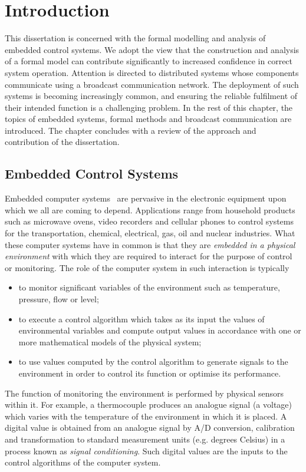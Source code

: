 \chapter{Introduction}\label{chap:intro}
This dissertation is concerned with the formal modelling and analysis
of embedded control systems. We adopt the view that the construction
and analysis of a formal model can contribute significantly to
increased confidence in correct system operation. Attention is
directed to distributed systems whose components communicate using a
broadcast communication network. The deployment of such systems is
becoming increasingly common, and ensuring the reliable fulfilment of
their intended function is a challenging problem. In the rest of
this chapter, the topics of embedded systems, formal methods and
broadcast communication are introduced. The chapter concludes with a
review of the approach and contribution of the dissertation.

\section{Embedded Control Systems}\label{sec:introembedded}
Embedded computer systems~\cite{kop:97} are pervasive in the
electronic equipment upon which we all are coming to
depend. Applications range from household products such as microwave
ovens, video recorders and cellular phones to control systems for the
transportation, chemical, electrical, gas, oil and nuclear
industries. What these computer systems have in common is that they
are \emph{embedded in a physical environment} with which they are
required to interact for the purpose of control or monitoring. The
role of the computer system in such interaction is typically
\begin{itemize}
\item to monitor significant variables of the environment such as temperature,
pressure, flow or level;  
\item to execute a control algorithm which takes as its input the values of 
environmental variables and compute output values in accordance with one or 
more mathematical models of the physical system;
\item to use values computed by the control algorithm to generate 
signals to the environment in order to control its function or optimise its 
performance.
\end{itemize}

The function of monitoring the environment is performed by physical
sensors within it. For example, a thermocouple produces an analogue signal (a
voltage) which varies with the temperature of the environment in which
it is placed. A digital value is obtained from an analogue signal by
A/D conversion, calibration and transformation to standard measurement
units (e.g. degrees Celsius) in a process known as \emph{signal
conditioning}. Such digital values are the inputs to the control algorithms
of the computer system.

